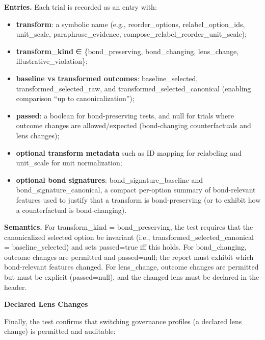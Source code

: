 \documentclass[12pt]{article}
\theoremstyle{plain}
\theoremstyle{definition}
\theoremstyle{remark}
\begin{document}
\textbf{Entries.} Each trial is recorded as an entry with:

\begin{itemize}
\item
  \textbf{transform}: a symbolic name (e.g., reorder\_options,
  relabel\_option\_ids, unit\_scale, paraphrase\_evidence,
  compose\_relabel\_reorder\_unit\_scale);
\item
  \textbf{transform\_kind} ∈ \{bond\_preserving, bond\_changing,
  lens\_change, illustrative\_violation\};
\item
  \textbf{baseline vs transformed outcomes}: baseline\_selected,
  transformed\_selected\_raw, and transformed\_selected\_canonical
  (enabling comparison ``up to canonicalization'');
\item
  \textbf{passed}: a boolean for bond-preserving tests, and null for
  trials where outcome changes are allowed/expected (bond-changing
  counterfactuals and lens changes);
\item
  \textbf{optional transform metadata} such as ID mapping for relabeling
  and unit\_scale for unit normalization;
\item
  \textbf{optional bond signatures}: bond\_signature\_baseline and
  bond\_signature\_canonical, a compact per-option summary of
  bond-relevant features used to justify that a transform is
  bond-preserving (or to exhibit how a counterfactual is bond-changing).
\end{itemize}

\textbf{Semantics.} For transform\_kind = bond\_preserving, the test
requires that the canonicalized selected option be invariant (i.e.,
transformed\_selected\_canonical = baseline\_selected) and sets
passed=true iff this holds. For bond\_changing, outcome changes are
permitted and passed=null; the report must exhibit which bond-relevant
features changed. For lens\_change, outcome changes are permitted but
must be explicit (passed=null), and the changed lens must be declared in
the header.

\textbf{Declared Lens Changes}

Finally, the test confirms that switching governance profiles (a
declared lens change) is permitted and auditable:
\end{document}
